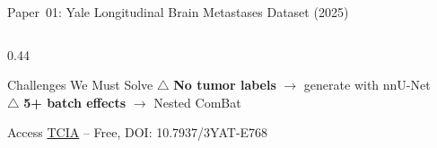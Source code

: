 \documentclass[aspectratio=169,xcolor=dvipsnames]{beamer}
\begin{document}
\begin{frame}{Paper~01: Yale Longitudinal Brain Metastases Dataset (2025)}
\begin{columns}
\begin{column}{0.44\textwidth}
            \vspace{0.1em}

            \begin{alertblock}{Challenges We Must Solve}
                \small
                $\triangle$ \textbf{No tumor labels} $\to$ generate with nnU-Net\\
                $\triangle$ \textbf{5+ batch effects} $\to$ Nested ComBat\\
            \end{alertblock}

            \begin{exampleblock}{\scriptsize {} Access}
                \scriptsize \href{https://www.cancerimagingarchive.net/}{TCIA} -- Free, DOI: 10.7937/3YAT-E768
            \end{exampleblock}
        \end{column}
    \end{columns}
\end{frame}
\end{document}
